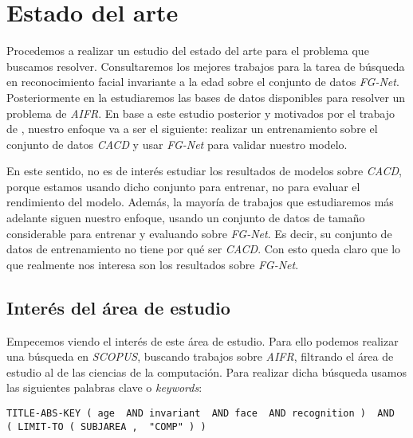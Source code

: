 \chapter{Estado del arte} \label{ich:estado_arte}


Procedemos a realizar un estudio del estado del arte para el problema que buscamos resolver. Consultaremos los mejores trabajos para la tarea de búsqueda en reconocimiento facial invariante a la edad sobre el conjunto de datos \textit{FG-Net}. Posteriormente en la  estudiaremos las bases de datos disponibles para resolver un problema de \textit{AIFR}. En base a este estudio posterior y motivados por el trabajo de \cite{informatica:best_fgnet_model}, nuestro enfoque va a ser el siguiente: realizar un entrenamiento sobre el conjunto de datos \textit{CACD} y usar \textit{FG-Net} para validar nuestro modelo.

En este sentido, no es de interés estudiar los resultados de modelos sobre \textit{CACD}, porque estamos usando dicho conjunto para entrenar, no para evaluar el rendimiento del modelo. Además, la mayoría de trabajos que estudiaremos más adelante siguen nuestro enfoque, usando un conjunto de datos de tamaño considerable para entrenar y evaluando sobre \textit{FG-Net}. Es decir, su conjunto de datos de entrenamiento no tiene por qué ser \textit{CACD}. Con esto queda claro que lo que realmente nos interesa son los resultados sobre \textit{FG-Net}.

\section{Interés del área de estudio} \label{isec:interesareaestudio}

Empecemos viendo el interés de este área de estudio. Para ello podemos realizar una búsqueda en \textit{SCOPUS}, buscando trabajos sobre \textit{AIFR}, filtrando el área de estudio al de las ciencias de la computación. Para realizar dicha búsqueda usamos las siguientes palabras clave o \textit{keywords}:

\begin{lstlisting}[caption=\textit{Keywords usadas para la búsqueda en \textit{SCOPUS}.}, label=code:scopus_search, captionpos=b]
    TITLE-ABS-KEY ( age  AND invariant  AND face  AND recognition )  AND  ( LIMIT-TO ( SUBJAREA ,  "COMP" ) )
\end{lstlisting}


